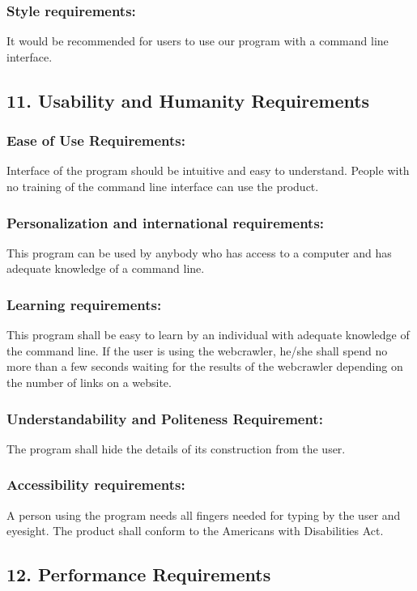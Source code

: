 \documentclass[12pt]{article}
\begin{document}
\subsubsection{Style requirements: }It would be recommended for users to use our program with a command line interface.

\subsection{11. Usability and Humanity Requirements }

\subsubsection{Ease of Use Requirements:} Interface of the program should be intuitive and easy to understand. People with no training of the command line interface can use the product.

\subsubsection{Personalization and international requirements: }This program can be used by anybody who has access to a computer and has adequate knowledge of a command line.

\subsubsection{Learning requirements:}  This program shall be easy to learn by an individual with adequate knowledge of the command line. If the user is using the webcrawler, he/she shall spend no more than a few seconds waiting for the results of the webcrawler depending on the number of links on a website.

\subsubsection{Understandability and Politeness Requirement: }The program shall hide the details of its construction from the user.

\subsubsection{Accessibility requirements:} A person using the program needs all fingers needed for typing by the user and eyesight. The product shall conform to the Americans with Disabilities Act.

\subsection{12. Performance Requirements }
\end{document}
